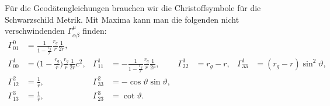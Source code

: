 %
Für die Geodätengleichungen brauchen wir die Christoffsymbole 
für die Schwarzschild Metrik.
Mit Maxima kann man die folgenden nicht verschwindenden
$\Gamma^\mu_{\alpha\beta}$ 
finden:
\begin{align*}
\Gamma^0_{01}
&=
\frac{1}{1-\displaystyle\frac{r_g}{r}}
\frac{r_g}{r}
\frac{1}{2r},
\\
\Gamma^1_{00}
&=
\biggl(1-\displaystyle\frac{r_g}{r}\biggr)
\frac{r_g}{r}
\frac{1}{2r}c^2,
&
\Gamma^1_{11}
&=
-\frac1{1-\displaystyle\frac{r_g}{r}}
\frac{r_g}{r}
\frac{1}{2r},
&
\Gamma^1_{22}
&=
r_g-r,
&
\Gamma^1_{33}
&=
(r_g-r)\sin^2\vartheta,
\\
\Gamma^2_{12}
&=
\frac1r,
&
\Gamma^2_{33}
&=
-\cos\vartheta \sin\vartheta,
\\
\Gamma^3_{13}
&=
\frac1r,
&
\Gamma^3_{23}
&=
\cot\vartheta.
\end{align*}
